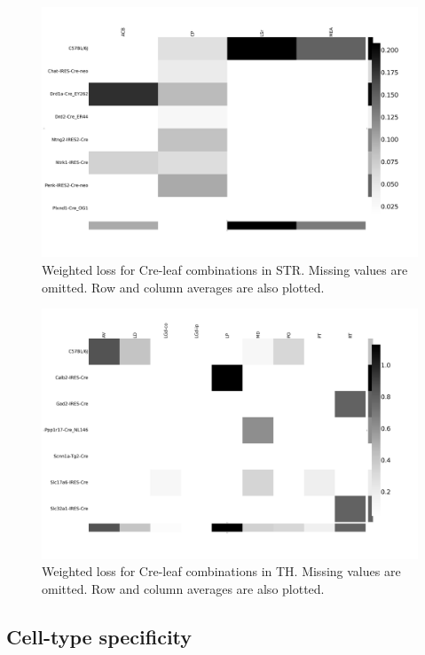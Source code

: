 \begin{figure}[H]
    \centering
    \includegraphics[width = 7in]{figs/lossdetails_477.png} 
    \caption{Weighted loss for Cre-leaf combinations in STR. Missing values are omitted.   Row and column averages are also plotted.}
\end{figure}

\begin{figure}[H]
    \centering
    \includegraphics[width = 7in]{figs/lossdetails_549.png} 
    \caption{Weighted loss for Cre-leaf combinations in TH. Missing values are omitted.   Row and column averages are also plotted.}
\end{figure}

\newpage

\subsection{Cell-type specificity}

